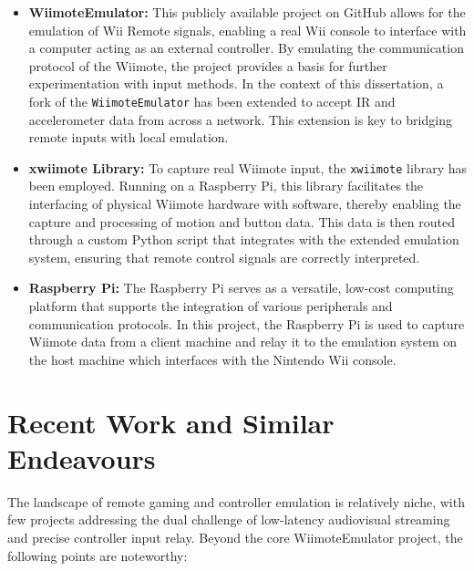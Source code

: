 \begin{itemize}
	\item \textbf{WiimoteEmulator\cite{wiimote_emulator}:} This publicly available project on GitHub allows for the emulation of Wii Remote signals, enabling a real Wii console to interface with a computer acting as an external controller. By emulating the communication protocol of the Wiimote, the project provides a basis for further experimentation with input methods. In the context of this dissertation, a fork of the \texttt{WiimoteEmulator} has been extended to accept IR and accelerometer data from across a network. This extension is key to bridging remote inputs with local emulation.

	\item    \textbf{xwiimote Library\cite{xwiimote}:} To capture real Wiimote input, the \texttt{xwiimote} library has been employed. Running on a Raspberry Pi, this library facilitates the interfacing of physical Wiimote hardware with software, thereby enabling the capture and processing of motion and button data. This data is then routed through a custom Python script that integrates with the extended emulation system, ensuring that remote control signals are correctly interpreted.

	\item \textbf{Raspberry Pi:} The Raspberry Pi serves as a versatile, low-cost computing platform that supports the integration of various peripherals and communication protocols. In this project, the Raspberry Pi is used to capture Wiimote data from a client machine and relay it to the emulation system on the host machine which interfaces with the Nintendo Wii console.

\end{itemize}

\section{Recent Work and Similar Endeavours}

The landscape of remote gaming and controller emulation is relatively niche, with few projects addressing the dual challenge of low-latency audiovisual streaming and precise controller input relay. Beyond the core WiimoteEmulator project, the following points are noteworthy:

